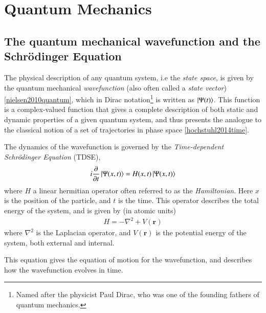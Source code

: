 \documentclass{subfiles}
\begin{document}
\section{Quantum Mechanics}
\subsection*{The quantum mechanical wavefunction and the Schrödinger Equation}
The physical description of any quantum system, i.e the \emph{state space}, is given by the quantum mechanical \emph{wavefunction} (also often called a \emph{state vector})\ref{nielsen2010quantum}, which in Dirac notation\footnote{Named after the physicist Paul Dirac, who was one of the founding fathers of quantum mechanics.} is written as $\ket{\Psi(t)}$. 
This function is a complex-valued function that gives a complete description of both static and dynamic properties of a given quantum system, and thus presents the analogue to the classical notion of a set of trajectories in phase space \ref{hochstuhl2014time}. 

The dynamics of the wavefunction is governed by the \emph{Time-dependent Schrödinger Equation} (TDSE),
\begin{equation}
    i\frac{\partial}{\partial t}\ket{\Psi(x, t)} = H(x,t)\ket{\Psi(x, t)}\label{eq:_tdse}
\end{equation}
where $H$ a linear hermitian operator often referred to as the \emph{Hamiltonian}. Here $x$ is the position of the particle, and $t$ is the time. 
This operator describes the total energy of the system, and is given by (in atomic units)
\begin{align*}
    H = -\nabla^2 + V(\mathbf{r})
\end{align*}
where $\nabla^2$ is the Laplacian operator, and $V(\mathbf{r})$ is the potential energy of the system, both external and internal.


This equation gives the equation of motion for the wavefunction, and describes how the wavefunction evolves in time.
\end{document}
